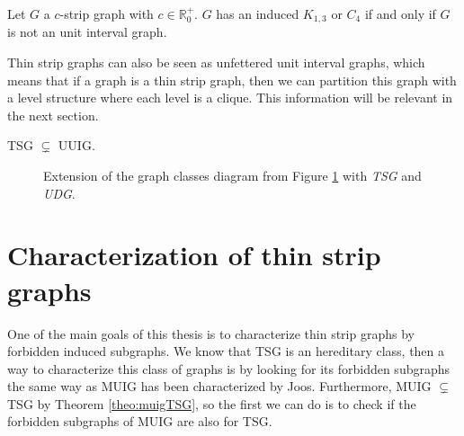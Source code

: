 \begin{theorem}
  \label{theo:induced_TSG}
  Let $G$ a $c$-strip graph with $c \in \mathbb{R}_0^+$. $G$ has an induced $K_{1,3}$ or $C_4$ if and only if $G$ is not an unit interval graph.
\end{theorem}

Thin strip graphs can also be seen as unfettered unit interval graphs, which means that if a graph is a thin strip graph, then we can partition this graph with a level structure where each level is a clique. This information will be relevant in the next section.

\begin{theorem}
  TSG $\subsetneq$ UUIG.
\end{theorem}



\begin{figure}
\begin{center}
\begin{scaletikzpicturetowidth}{\textwidth}
\end{scaletikzpicturetowidth}
\end{center}
  \caption{Extension of the graph classes diagram from Figure \ref{fig:hierarchyTSG} with \emph{TSG} and \emph{UDG}.}
\label{fig:hierarchyTSG}
\end{figure}

\section{Characterization of thin strip graphs}

One of the main goals of this thesis is to characterize thin strip graphs by forbidden induced subgraphs. We know that TSG is an hereditary class, then a way to characterize this class of graphs is by looking for its forbidden subgraphs the same way as MUIG has been characterized by Joos. Furthermore, MUIG $\subsetneq$ TSG by Theorem \ref{theo:muigTSG}, so the first we can do is to check if the forbidden subgraphs of MUIG are also for TSG.



